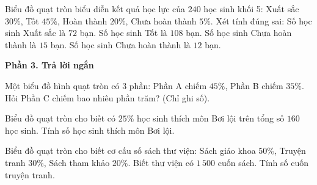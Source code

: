 \begin{ex} %
Biểu đồ quạt tròn biểu diễn kết quả học lực của $240$ học sinh khối 5: Xuất sắc $30\%$, Tốt $45\%$, Hoàn thành $20\%$, Chưa hoàn thành $5\%$. Xét tính đúng sai:
\choiceTF
{\True Số học sinh Xuất sắc là $72$ bạn.}
{\True Số học sinh Tốt là $108$ bạn.}
{Số học sinh Chưa hoàn thành là $15$ bạn.}
{\True Số học sinh Chưa hoàn thành là $12$ bạn.}
\end{ex}

\textbf{Phần 3. Trả lời ngắn}

\begin{ex} %
Một biểu đồ hình quạt tròn có 3 phần: Phần A chiếm $45\%$, Phần B chiếm $35\%$. Hỏi Phần C chiếm bao nhiêu phần trăm? (Chỉ ghi số).
\end{ex}

\begin{ex} %
Biểu đồ quạt tròn cho biết có $25\%$ học sinh thích môn Bơi lội trên tổng số $160$ học sinh. Tính số học sinh thích môn Bơi lội.
\end{ex}

\begin{ex} %
Biểu đồ quạt tròn cho biết cơ cấu số sách thư viện: Sách giáo khoa $50\%$, Truyện tranh $30\%$, Sách tham khảo $20\%$. Biết thư viện có $1\,500$ cuốn sách. Tính số cuốn truyện tranh.
\end{ex}

